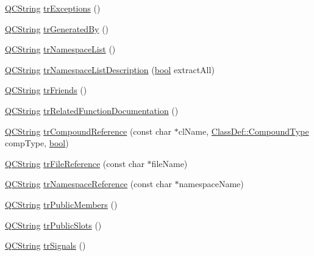 \begin{DoxyCompactItemize}
\item 
\hyperlink{class_q_c_string}{Q\+C\+String} \hyperlink{class_translator_croatian_a4fea439896fcff5996180d18b51ae32c}{tr\+Exceptions} ()
\item 
\hyperlink{class_q_c_string}{Q\+C\+String} \hyperlink{class_translator_croatian_ae878281bdefd1503fe03a65ab1f65c3e}{tr\+Generated\+By} ()
\item 
\hyperlink{class_q_c_string}{Q\+C\+String} \hyperlink{class_translator_croatian_a95224cf59498abd0876a5b1197ac68f8}{tr\+Namespace\+List} ()
\item 
\hyperlink{class_q_c_string}{Q\+C\+String} \hyperlink{class_translator_croatian_ace23332dedd9c5eff8cbcf5c0900b50a}{tr\+Namespace\+List\+Description} (\hyperlink{qglobal_8h_a1062901a7428fdd9c7f180f5e01ea056}{bool} extract\+All)
\item 
\hyperlink{class_q_c_string}{Q\+C\+String} \hyperlink{class_translator_croatian_a0813b171fab34d20f8ba51ac05b71d32}{tr\+Friends} ()
\item 
\hyperlink{class_q_c_string}{Q\+C\+String} \hyperlink{class_translator_croatian_a17099996311c6f1e67a5f0c843426901}{tr\+Related\+Function\+Documentation} ()
\item 
\hyperlink{class_q_c_string}{Q\+C\+String} \hyperlink{class_translator_croatian_a321d4b92d22bb583e8ff1c5ac468896c}{tr\+Compound\+Reference} (const char $\ast$cl\+Name, \hyperlink{class_class_def_ae70cf86d35fe954a94c566fbcfc87939}{Class\+Def\+::\+Compound\+Type} comp\+Type, \hyperlink{qglobal_8h_a1062901a7428fdd9c7f180f5e01ea056}{bool})
\item 
\hyperlink{class_q_c_string}{Q\+C\+String} \hyperlink{class_translator_croatian_a53621d36c131a29c03ab5c162dca1735}{tr\+File\+Reference} (const char $\ast$file\+Name)
\item 
\hyperlink{class_q_c_string}{Q\+C\+String} \hyperlink{class_translator_croatian_a045170e05b41f0d05ebb1ca532df44fa}{tr\+Namespace\+Reference} (const char $\ast$namespace\+Name)
\item 
\hyperlink{class_q_c_string}{Q\+C\+String} \hyperlink{class_translator_croatian_a63d660f99f7439218f0100fcf0c2580a}{tr\+Public\+Members} ()
\item 
\hyperlink{class_q_c_string}{Q\+C\+String} \hyperlink{class_translator_croatian_aabe5bfba520e49cc4677a1c204b3c746}{tr\+Public\+Slots} ()
\item 
\hyperlink{class_q_c_string}{Q\+C\+String} \hyperlink{class_translator_croatian_a9a45e4a6cd593c10570d78dd1441a4c3}{tr\+Signals} ()
\item 

\end{DoxyCompactItemize}

